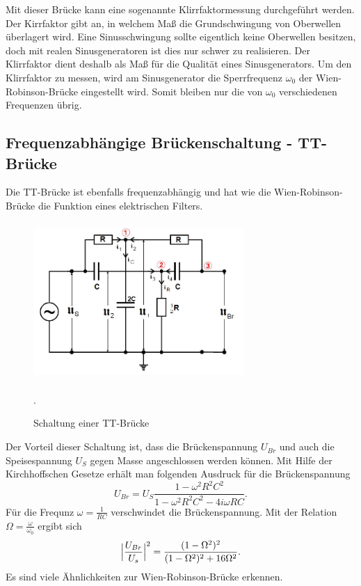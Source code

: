 \noindent Mit dieser Brücke kann eine sogenannte Klirrfaktormessung durchgeführt werden.
Der Kirrfaktor gibt an, in welchem Maß die Grundschwingung von Oberwellen überlagert
wird. Eine Sinusschwingung sollte eigentlich keine Oberwellen besitzen, doch mit realen
Sinusgeneratoren ist dies nur schwer zu realisieren. Der Klirrfaktor dient deshalb
als Maß für die Qualität eines Sinusgenerators.
Um den Klirrfaktor zu messen, wird am Sinusgenerator die Sperrfrequenz $\omega_{0}$
der Wien-Robinson-Brücke eingestellt wird. Somit bleiben nur die von $\omega_{0}$
verschiedenen Frequenzen übrig.

\subsection{Frequenzabhängige Brückenschaltung - TT-Brücke}
Die TT-Brücke ist ebenfalls frequenzabhängig und hat wie die Wien-Robinson-Brücke
die Funktion eines elektrischen Filters.

\begin{figure}[H]
  \centering
  \includegraphics[width=8cm,height=6cm]{tt.JPG}
  \caption{Schaltung einer TT-Brücke}
  \label{fig:tt}
  \cite{skript}.
\end{figure}

\noindent Der Vorteil dieser Schaltung ist, dass die Brückenspannung $U_{Br}$ und auch
die Speisespannung $U_{S}$ gegen Masse angeschlossen werden können.
Mit Hilfe der Kirchhoffschen Gesetze erhält man folgenden Ausdruck für die
Brückenspannung
\begin{equation}
  U_{Br}=U_{S}\frac{1-\omega^2 R^2C^2}{1-\omega^2 R^2C^2-4i\omega RC}.
  \label{eqn:ubr}
\end{equation}
Für die Frequnz $\omega=\frac{1}{RC}$ verschwindet die Brückenspannung. Mit der
Relation $\Omega=\frac{\omega}{\omega_{0}}$ ergibt sich
\begin{equation}
  \Bigl|\frac{U_{Br}}{U_{s}}\Bigr|^2=\frac{(1-\Omega^2)^2}{(1-\Omega^2)^2+16\Omega^2}.
\end{equation}
Es sind viele Ähnlichkeiten zur Wien-Robinson-Brücke erkennen.



\label{sec:Theorie}

